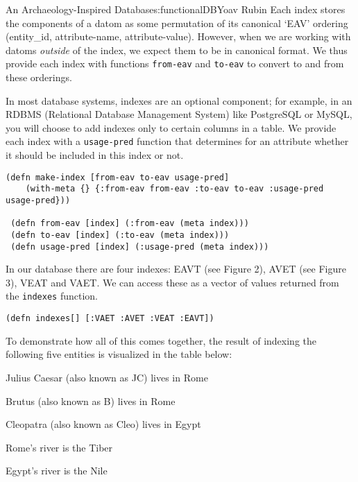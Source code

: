 \begin{aosachapter}{An Archaeology-Inspired Database}{s:functionalDB}{Yoav Rubin}
Each index stores the components of a datom as some permutation of its
canonical `EAV' ordering (entity\_id, attribute-name, attribute-value).
However, when we are working with datoms \emph{outside} of the index, we
expect them to be in canonical format. We thus provide each index with
functions \texttt{from-eav} and \texttt{to-eav} to convert to and from
these orderings.

In most database systems, indexes are an optional component; for
example, in an RDBMS (Relational Database Management System) like
PostgreSQL or MySQL, you will choose to add indexes only to certain
columns in a table. We provide each index with a \texttt{usage-pred}
function that determines for an attribute whether it should be included
in this index or not.

\begin{verbatim}
(defn make-index [from-eav to-eav usage-pred]
    (with-meta {} {:from-eav from-eav :to-eav to-eav :usage-pred usage-pred}))
 
 (defn from-eav [index] (:from-eav (meta index)))
 (defn to-eav [index] (:to-eav (meta index)))
 (defn usage-pred [index] (:usage-pred (meta index)))
\end{verbatim}

In our database there are four indexes: EAVT (see Figure 2), AVET (see
Figure 3), VEAT and VAET. We can access these as a vector of values
returned from the \texttt{indexes} function.

\begin{verbatim}
(defn indexes[] [:VAET :AVET :VEAT :EAVT])
\end{verbatim}

To demonstrate how all of this comes together, the result of indexing
the following five entities is visualized in the table below:

\begin{aosaenumerate}
\def\labelenumi{\arabic{enumi}.}

\item
  Julius Caesar (also known as JC) lives in Rome
\item
  Brutus (also known as B) lives in Rome
\item
  Cleopatra (also known as Cleo) lives in Egypt
\item
  Rome's river is the Tiber
\item
  Egypt's river is the Nile
\end{aosaenumerate}


\end{aosachapter}
